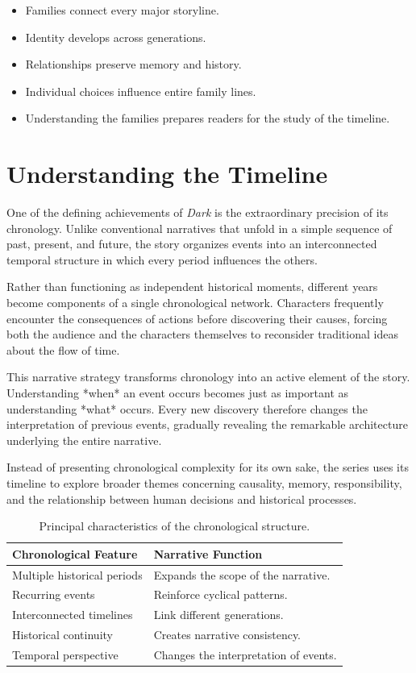 \documentclass[12pt,oneside,openany]{book}
\begin{document}
\begin{tcolorbox}[colback=orange!8,colframe=orange!70!black,title=Chapter Takeaways]
\begin{itemize}
\item Families connect every major storyline.
\item Identity develops across generations.
\item Relationships preserve memory and history.
\item Individual choices influence entire family lines.
\item Understanding the families prepares readers for the study of the timeline.
\end{itemize}
\end{tcolorbox}
\section{Understanding the Timeline}

One of the defining achievements of \textit{Dark} is the extraordinary precision
of its chronology. Unlike conventional narratives that unfold in a simple
sequence of past, present, and future, the story organizes events into an
interconnected temporal structure in which every period influences the others.

Rather than functioning as independent historical moments, different years
become components of a single chronological network. Characters frequently
encounter the consequences of actions before discovering their causes, forcing
both the audience and the characters themselves to reconsider traditional ideas
about the flow of time.

This narrative strategy transforms chronology into an active element of the
story. Understanding *when* an event occurs becomes just as important as
understanding *what* occurs. Every new discovery therefore changes the
interpretation of previous events, gradually revealing the remarkable
architecture underlying the entire narrative.

Instead of presenting chronological complexity for its own sake, the series
uses its timeline to explore broader themes concerning causality, memory,
responsibility, and the relationship between human decisions and historical
processes.

\begin{table}[H]
\centering
\begin{tabular}{|p{4cm}|p{8cm}|}
\hline
\textbf{Chronological Feature} & \textbf{Narrative Function}\\
\hline
Multiple historical periods & Expands the scope of the narrative.\\
\hline
Recurring events & Reinforce cyclical patterns.\\
\hline
Interconnected timelines & Link different generations.\\
\hline
Historical continuity & Creates narrative consistency.\\
\hline
Temporal perspective & Changes the interpretation of events.\\
\hline
\end{tabular}
\caption{Principal characteristics of the chronological structure.}
\end{table}
\end{document}
